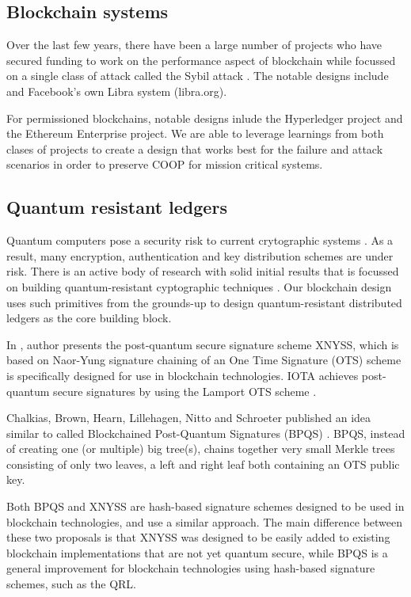 \subsection{Blockchain systems}
Over the last few years, there have been a large number of projects who have secured funding
to work on the performance aspect of blockchain while focussed on a single class of attack
called the Sybil attack \cite{john2002}. The notable designs include \cite{rapidchain, chainspace, ava2018, thundertoken} and Facebook's own Libra system (libra.org).

For permissioned blockchains, notable designs inlude the Hyperledger project and the Ethereum Enterprise project. We are
able to leverage learnings from both clases of projects to create a design that works best for the failure and
attack scenarios in order to preserve COOP for mission critical systems.

\subsection{Quantum resistant ledgers}

Quantum computers pose a security risk to current crytographic systems \cite{dasgupta2019}. As a result, many
encryption, authentication and key distribution schemes are under risk. There is an active body of research with solid
initial results that is focussed on building quantum-resistant cyptographic techniques \cite{qrl2016}. Our blockchain design
uses such primitives from the grounds-up to design quantum-resistant distributed ledgers as the core building block.

In \cite{linde2018}, author presents the post-quantum secure signature scheme XNYSS, which is
based on Naor-Yung signature chaining of an One Time Signature (OTS) scheme is specifically designed for use in blockchain
technologies. IOTA \cite{iota2018} achieves post-quantum secure signatures by using the Lamport
OTS scheme \cite{lamport1979}.

Chalkias, Brown, Hearn, Lillehagen, Nitto and Schroeter published an idea similar to \cite{linde2018} called Blockchained
Post-Quantum Signatures (BPQS) \cite{bpqs}. BPQS, instead of creating one (or multiple) big tree(s), chains together very small
Merkle trees consisting of only two leaves, a left and right leaf both containing an OTS public key. 

Both BPQS and XNYSS are hash-based signature schemes designed to be used in blockchain technologies, and use a similar
approach. The main difference between these two proposals is that XNYSS was designed to be easily added to existing
blockchain implementations that are not yet quantum secure, while BPQS is a general improvement for blockchain
technologies using hash-based signature schemes, such as the QRL. 

